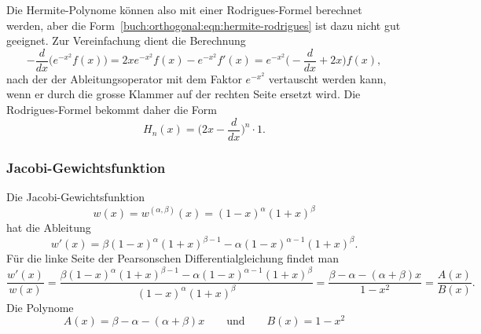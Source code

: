 Die Hermite-Polynome können also mit einer Rodrigues-Formel berechnet werden,
aber die Form~\eqref{buch:orthogonal:eqn:hermite-rodrigues} ist dazu
nicht gut geeignet.
Zur Vereinfachung dient die Berechnung 
\[
-\frac{d}{dx}
\bigl(
e^{-x^2}f(x)
\bigr)
=
2xe^{-x^2}f(x)
-
e^{-x^2}f'(x)
=
e^{-x^2}
\biggl(-\frac{d}{dx}+2x\biggr)
f(x),
\]
nach der der Ableitungsoperator mit dem Faktor $e^{-x^2}$ 
vertauscht werden kann, wenn er durch die grosse Klammer auf der
rechten Seite ersetzt wird.
Die Rodrigues-Formel bekommt daher die Form
\[
H_n(x) = \biggl(2x-\frac{d}{dx}\biggr)^n \cdot 1.
\]



%
%
\subsubsection{Jacobi-Gewichtsfunktion}
%
Die Jacobi-Gewichtsfunktion 
%
%
\[
w(x)
=
w^{(\alpha,\beta)}(x)
=
(1-x)^\alpha(1+x)^\beta
\]
hat die Ableitung
\[
w'(x)
=
\beta(1-x)^\alpha(1+x)^{\beta-1}-\alpha(1-x)^{\alpha-1}(1+x)^\beta.
\]
Für die linke Seite der Pearsonschen Differentialgleichung findet man
\[
\frac{w'(x)}{w(x)}
=
\frac{
\beta(1-x)^\alpha(1+x)^{\beta-1}-\alpha(1-x)^{\alpha-1}(1+x)^\beta
}{
(1-x)^\alpha(1+x)^\beta
}
=
\frac{\beta-\alpha-(\alpha+\beta)x}{1-x^2}
=
\frac{A(x)}{B(x)}.
\]
Die Polynome
\[
A(x)
=
\beta-\alpha-(\alpha+\beta)x
\qquad\text{und}\qquad
B(x)
=
1-x^2
\]
